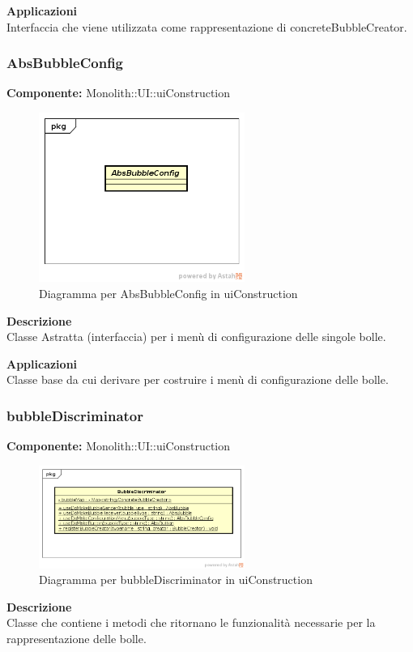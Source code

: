 \textbf{Applicazioni}\\
Interfaccia che viene utilizzata come rappresentazione di concreteBubbleCreator. 


\clearpage

\subsubsection{AbsBubbleConfig}
\textbf{Componente:}  Monolith::UI::uiConstruction\\
   \FloatBarrier
   \begin{figure}[ht]
   \centering
   \includegraphics[width=0.6\textwidth]{img/single-AbsBubbleConfig.png}
   \caption{{Diagramma per AbsBubbleConfig in uiConstruction}}
\end{figure}
\FloatBarrier
\textbf{Descrizione}\\
Classe Astratta (interfaccia) per i menù di configurazione delle singole bolle. 


\textbf{Applicazioni}\\
Classe base da cui derivare per costruire i menù di configurazione delle bolle. 


\clearpage

\subsubsection{bubbleDiscriminator}
\textbf{Componente:}  Monolith::UI::uiConstruction\\
   \FloatBarrier
   \begin{figure}[ht]
   \centering
   \includegraphics[width=0.6\textwidth]{img/single-bubbleDiscriminator.png}
   \caption{{Diagramma per bubbleDiscriminator in uiConstruction}}
\end{figure}
\FloatBarrier
\textbf{Descrizione}\\
Classe che contiene i metodi che ritornano le funzionalità necessarie per la rappresentazione delle bolle.

